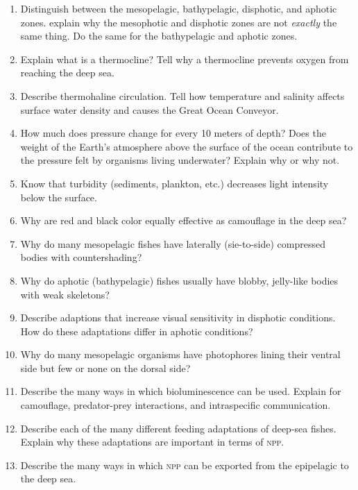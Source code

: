 \documentclass[nofonts, letterpaper]{tufte-handout}
\begin{document}
\begin{enumerate}

\item
  Distinguish between the mesopelagic, bathypelagic, disphotic, and aphotic zones. 
  explain why the mesophotic and disphotic zones are not \emph{exactly} the same thing.
  Do the same for the bathypelagic and aphotic zones.

\item
  Explain what is a thermocline? Tell why a thermocline prevents oxygen from 
  reaching the deep sea.
  
\item
  Describe thermohaline circulation. Tell 
  how temperature and salinity affects surface water density and causes the Great Ocean Conveyor.

\item
  How much does pressure change for every 10 meters of depth? Does the weight of the
  Earth's atmosphere above the surface of the ocean contribute to the pressure felt
  by organisms living underwater? Explain why or why not.

\item
  Know that turbidity (sediments, plankton, etc.) decreases light intensity below the surface.

\item
  Why are red and black color equally effective as camouflage in the deep sea?

\item
  Why do many mesopelagic fishes have laterally (sie-to-side) compressed bodies with
  countershading?
  
\item
	Why do aphotic (bathypelagic) fishes usually have blobby, jelly-like bodies with
	weak skeletons?
	
\item
	Describe adaptions that increase visual sensitivity in disphotic conditions. How
	do these adaptations differ in aphotic conditions?


\item
  	Why do many mesopelagic organisms have photophores lining their ventral side but
  	few or none on the dorsal side?
  	
\item
  	Describe the many ways in which bioluminescence can be used. Explain for
  	camouflage, predator-prey interactions, and intraspecific communication.
  	
\item
	Describe each of the many different feeding adaptations of deep-sea fishes. Explain
	why these adaptations are important in terms of \textsc{npp.}
  
\item
	Describe the many ways in which \textsc{npp} can be exported from the epipelagic to
	the deep sea.

 
 \end{enumerate}
\end{document}
